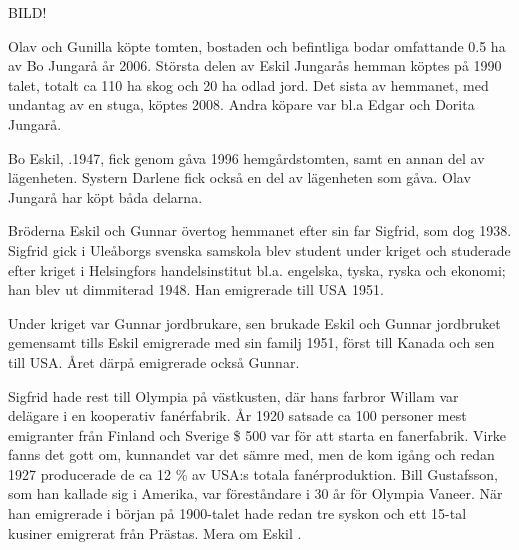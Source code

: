 
BILD!

Olav och Gunilla köpte tomten, bostaden och befintliga bodar omfattande 0.5 ha av Bo Jungarå år 2006. Största delen av Eskil Jungarås hemman köptes på 1990 talet, totalt ca 110 ha skog och 20 ha odlad jord. Det sista av hemmanet, med undantag av en stuga, köptes 2008. Andra köpare var bl.a Edgar och Dorita Jungarå.


Bo Eskil, .1947, fick genom gåva 1996 hemgårdstomten, samt en annan del av lägenheten. Systern Darlene fick också en del av lägenheten som gåva. Olav Jungarå har köpt båda delarna.



Bröderna Eskil och Gunnar övertog hemmanet efter sin far Sigfrid, som dog 1938. Sigfrid gick i Uleåborgs svenska samskola blev student under kriget och studerade efter kriget i Helsingfors handelsinstitut bl.a. engelska, tyska, ryska och ekonomi; han blev ut dimmiterad 1948. Han emigrerade till USA 1951.

Under kriget var Gunnar jordbrukare, sen brukade Eskil och Gunnar jordbruket gemensamt tills Eskil emigrerade med sin familj 1951, först till Kanada och sen till USA. Året därpå emigrerade också Gunnar.

Sigfrid hade rest till Olympia på västkusten, där hans farbror Willam var delägare i en kooperativ fanérfabrik. År 1920 satsade ca 100 personer mest emigranter från Finland och Sverige \$ 500 var för att starta en fanerfabrik. Virke fanns det gott om, kunnandet var det sämre med, men de kom igång och redan 1927 producerade de ca 12 \% av USA:s totala fanérproduktion. Bill Gustafsson, som han kallade sig i Amerika, var föreståndare i 30 år för Olympia Vaneer. När han emigrerade i början på 1900-talet hade redan tre syskon och ett 15-tal kusiner emigrerat från Prästas. Mera om Eskil .


